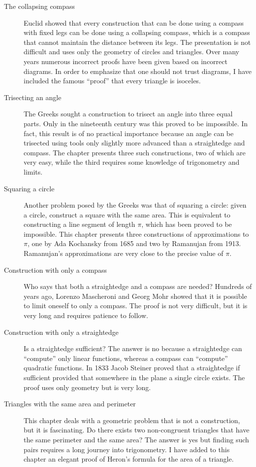 \begin{description}
\item[The collapsing compass] Euclid showed that every construction that can be done using a compass with fixed legs can be done using a collapsing compass, which is a compass that cannot maintain the distance between its legs. The presentation is not difficult and uses only the geometry of circles and triangles. Over many years numerous incorrect proofs have been given based on incorrect diagrams. In order to emphasize that one should not trust diagrams, I have included the famous ``proof'' that every triangle is isoceles.

\item[Trisecting an angle] The Greeks sought a construction to trisect an angle into three equal parts. Only in the nineteenth century was this proved to be impossible. In fact, this result is of no practical importance because an angle can be trisected using tools only slightly more advanced than a straightedge and compass. The chapter presents three such constructions, two of which are very easy, while the third requires some knowledge of trigonometry and limits.

\item[Squaring a circle] Another problem posed by the Greeks was that of squaring a circle: given a circle, construct a square with the same area. This is equivalent to constructing a line segment of length $\pi$, which has been proved to be impossible. This chapter presents three constructions of approximations to $\pi$, one by Ada Kochansky from 1685 and two by Ramanujan from 1913. Ramanujan's approximations are very close to the precise value of $\pi$.

\item[Construction with only a compass] Who says that both a straightedge and a compass are needed? Hundreds of years ago, Lorenzo Mascheroni and Georg Mohr showed that it is possible to limit oneself to only a compass. The proof is not very difficult, but it is very long and requires patience to follow.

\newpage

\item[Construction with only a straightedge] Is a straightedge sufficient? The answer is no because a straightedge can ``compute'' only linear functions, whereas a compass can ``compute'' quadratic functions. In 1833 Jacob Steiner proved that a straightedge if sufficient provided that somewhere in the plane a single circle exists. The proof uses only geometry but is very long.

\item[Triangles with the same area and perimeter] This chapter deals with a geometric problem that is not a construction, but it is fascinating. Do there exists two non-congruent triangles that have the same perimeter and the same area? The answer is yes but finding such pairs requires a long journey into trigonometry. I have added to this chapter an elegant proof of Heron's formula for the area of a triangle.

\end{description}
